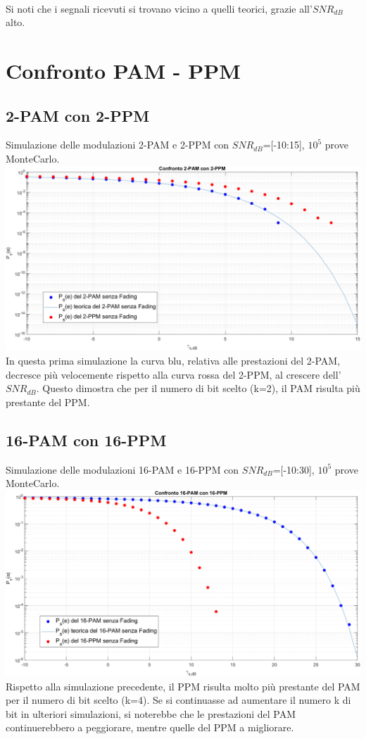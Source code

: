 \documentclass[12pt, a4paper]{article}
\begin{document}
	\\Si noti che i segnali ricevuti si trovano vicino a quelli teorici, grazie all'\(SNR_{dB}\) alto.
	
	
	
	\newpage
	\section{Confronto PAM - PPM}
	\subsection{2-PAM con 2-PPM}
	Simulazione delle modulazioni 2-PAM e 2-PPM con \(SNR_{dB}\)=[-10:15], \(10^5\) prove MonteCarlo. \vspace{.1cm}\\
	\includegraphics[width=\linewidth]{images/2-PAMvs2-PPM.png}
	In questa prima simulazione la curva blu, relativa alle prestazioni del 2-PAM, decresce più velocemente rispetto alla curva rossa del 2-PPM, al crescere dell'\(SNR_{dB}\). Questo dimostra che per il numero di bit scelto (k=2), il PAM risulta più prestante del PPM.
	\subsection{16-PAM con 16-PPM}
	Simulazione delle modulazioni 16-PAM e 16-PPM con \(SNR_{dB}\)=[-10:30], \(10^5\) prove MonteCarlo. \\
	\includegraphics[width=\linewidth]{images/PAMvsPPM.png}
	Rispetto alla simulazione precedente, il PPM risulta molto più prestante del PAM per il numero di bit scelto (k=4). Se si continuasse ad aumentare il numero k di bit in ulteriori simulazioni, si noterebbe che le prestazioni del PAM continuerebbero a peggiorare, mentre quelle del PPM a migliorare. 
	
\end{document}
